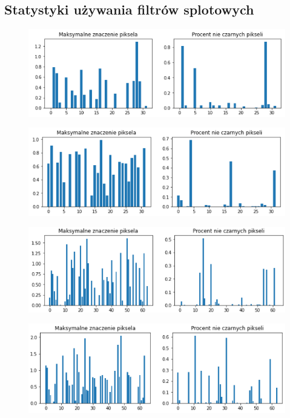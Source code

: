 \documentclass{article}
\begin{document}
\subsection{Statystyki używania filtrów splotowych}

\begin{figure}[H]
	\centering
	\includegraphics[width=1\textwidth,keepaspectratio=true]{statystyka_warstwy_1}
	\caption{}
	\label{statystyka_warstwy_1}
\end{figure}

\begin{figure}[H]
	\centering
	\includegraphics[width=1\textwidth,keepaspectratio=true]{statystyka_warstwy_2}
	\caption{}
	\label{statystyka_warstwy_2}
\end{figure}

\begin{figure}[H]
	\centering
	\includegraphics[width=1\textwidth,keepaspectratio=true]{statystyka_warstwy_3}
	\caption{}
	\label{statystyka_warstwy_3}
\end{figure}

\begin{figure}[H]
	\centering
	\includegraphics[width=1\textwidth,keepaspectratio=true]{statystyka_warstwy_4}
	\caption{}
	\label{statystyka_warstwy_4}
\end{figure}
\end{document}
